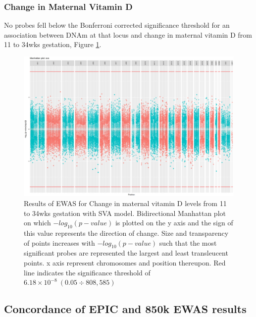 \documentclass[]{book}
\begin{document}
\hypertarget{change-in-maternal-vitamin-d}{%
\subsubsection{Change in Maternal Vitamin D}\label{change-in-maternal-vitamin-d}}

No probes fell below the Bonferroni corrected significance threshold for an association between DNAm at that locus and change in maternal vitamin D from 11 to 34wks gestation, Figure \ref{fig:MAVIDOSdifVDEPICewasManhattanSVA}.

\begin{figure}

{\centering \includegraphics[width=0.8\linewidth]{figs/MAVIDOSdifVDEPICewasManhattanSVA} 

}

\caption{Results of EWAS for Change in maternal vitamin D levels from 11 to 34wks gestation with SVA model. Bidirectional Manhattan plot on which \(-log_{10}(p-value)\) is plotted on the y axis and the sign of this value represents the direction of change. Size and transparency of points increases with \(-log_{10}(p-value)\) such that the most significant probes are represented the largest and least transleucent points. x axis represent chromosomes and position thereupon. Red line indicates the significance threshold of \(6.18\times10^{-8}~(0.05\div808,585)\)}\label{fig:MAVIDOSdifVDEPICewasManhattanSVA}
\end{figure}



\hypertarget{concordance-of-epic-and-850k-ewas-results}{%
\subsection{Concordance of EPIC and 850k EWAS results}\label{concordance-of-epic-and-850k-ewas-results}}
\end{document}
